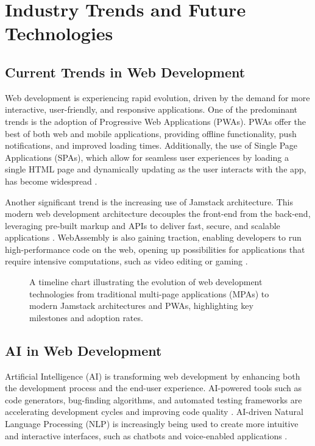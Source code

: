 \section{Industry Trends and Future Technologies}

\subsection{Current Trends in Web Development}
Web development is experiencing rapid evolution, driven by the demand for more interactive, user-friendly, and responsive applications. One of the predominant trends is the adoption of Progressive Web Applications (PWAs). PWAs offer the best of both web and mobile applications, providing offline functionality, push notifications, and improved loading times. Additionally, the use of Single Page Applications (SPAs), which allow for seamless user experiences by loading a single HTML page and dynamically updating as the user interacts with the app, has become widespread \cite{zhao2018progressive}.

Another significant trend is the increasing use of Jamstack architecture. This modern web development architecture decouples the front-end from the back-end, leveraging pre-built markup and APIs to deliver fast, secure, and scalable applications \cite{jamstack2020}. WebAssembly is also gaining traction, enabling developers to run high-performance code on the web, opening up possibilities for applications that require intensive computations, such as video editing or gaming \cite{wasm2019}.

\begin{figure}[h]
    \centering
    \caption{A timeline chart illustrating the evolution of web development technologies from traditional multi-page applications (MPAs) to modern Jamstack architectures and PWAs, highlighting key milestones and adoption rates.}
    \label{fig:timeline_chart}
\end{figure}

\subsection{AI in Web Development}
Artificial Intelligence (AI) is transforming web development by enhancing both the development process and the end-user experience. AI-powered tools such as code generators, bug-finding algorithms, and automated testing frameworks are accelerating development cycles and improving code quality \cite{miller2021ai}. AI-driven Natural Language Processing (NLP) is increasingly being used to create more intuitive and interactive interfaces, such as chatbots and voice-enabled applications \cite{nielsen2022nlp}.

